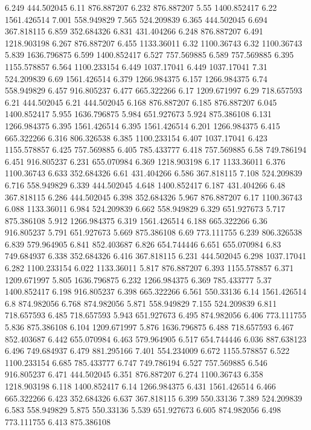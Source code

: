 6.249	444.502045
6.11	876.887207
6.232	876.887207
5.55	1400.852417
6.22	1561.426514
7.001	558.949829
7.565	524.209839
6.365	444.502045
6.694	367.818115
6.859	352.684326
6.831	431.404266
6.248	876.887207
6.491	1218.903198
6.267	876.887207
6.455	1133.36011
6.32	1100.36743
6.32	1100.36743
5.839	1636.796875
6.599	1400.852417
6.527	757.569885
6.589	757.569885
6.395	1155.578857
6.564	1100.233154
6.449	1037.17041
6.449	1037.17041
7.31	524.209839
6.69	1561.426514
6.379	1266.984375
6.157	1266.984375
6.74	558.949829
6.457	916.805237
6.477	665.322266
6.17	1209.671997
6.29	718.657593
6.21	444.502045
6.21	444.502045
6.168	876.887207
6.185	876.887207
6.045	1400.852417
5.955	1636.796875
5.984	651.927673
5.924	875.386108
6.131	1266.984375
6.395	1561.426514
6.395	1561.426514
6.201	1266.984375
6.415	665.322266
6.316	806.326538
6.385	1100.233154
6.407	1037.17041
6.423	1155.578857
6.425	757.569885
6.405	785.433777
6.418	757.569885
6.58	749.786194
6.451	916.805237
6.231	655.070984
6.369	1218.903198
6.17	1133.36011
6.376	1100.36743
6.633	352.684326
6.61	431.404266
6.586	367.818115
7.108	524.209839
6.716	558.949829
6.339	444.502045
4.648	1400.852417
6.187	431.404266
6.48	367.818115
6.286	444.502045
6.398	352.684326
5.967	876.887207
6.17	1100.36743
6.088	1133.36011
6.984	524.209839
6.662	558.949829
6.329	651.927673
5.717	875.386108
5.912	1266.984375
6.319	1561.426514
6.188	665.322266
6.36	916.805237
5.791	651.927673
5.669	875.386108
6.69	773.111755
6.239	806.326538
6.839	579.964905
6.841	852.403687
6.826	654.744446
6.651	655.070984
6.83	749.684937
6.338	352.684326
6.416	367.818115
6.231	444.502045
6.298	1037.17041
6.282	1100.233154
6.022	1133.36011
5.817	876.887207
6.393	1155.578857
6.371	1209.671997
5.805	1636.796875
6.232	1266.984375
6.369	785.433777
5.37	1400.852417
6.198	916.805237
6.398	665.322266
6.561	550.33136
6.14	1561.426514
6.8	874.982056
6.768	874.982056
5.871	558.949829
7.155	524.209839
6.811	718.657593
6.485	718.657593
5.943	651.927673
6.495	874.982056
6.406	773.111755
5.836	875.386108
6.104	1209.671997
5.876	1636.796875
6.488	718.657593
6.467	852.403687
6.442	655.070984
6.463	579.964905
6.517	654.744446
6.036	887.638123
6.496	749.684937
6.479	881.295166
7.401	554.234009
6.672	1155.578857
6.522	1100.233154
6.685	785.433777
6.747	749.786194
6.527	757.569885
6.546	916.805237
6.471	444.502045
6.351	876.887207
6.274	1100.36743
6.358	1218.903198
6.118	1400.852417
6.14	1266.984375
6.431	1561.426514
6.466	665.322266
6.423	352.684326
6.637	367.818115
6.399	550.33136
7.389	524.209839
6.583	558.949829
5.875	550.33136
5.539	651.927673
6.605	874.982056
6.498	773.111755
6.413	875.386108
